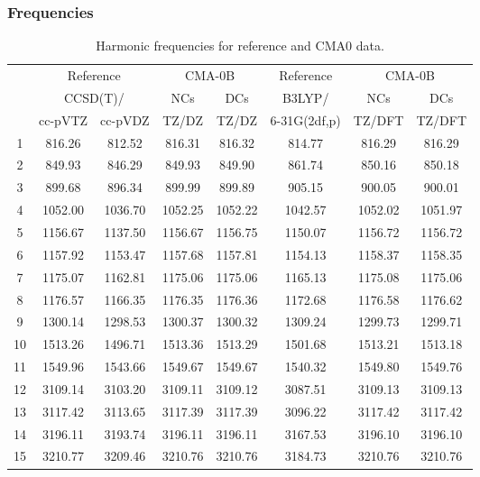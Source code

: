 \documentclass[10pt,oneside]{article}
\begin{document}
\subsubsection*{Frequencies}
\begin{table}[h!]
\centering
\caption{Harmonic frequencies for reference and CMA0 data.}
\begin{tabular}{cccccccc}
\toprule
{} & \multicolumn{2}{c}{Reference} & \multicolumn{2}{c}{CMA-0B} &    Reference & \multicolumn{2}{c}{CMA-0B} \\
{} & \multicolumn{2}{c}{CCSD(T)/} &     NCs &     DCs &       B3LYP/ &     NCs &     DCs \\
{} &   cc-pVTZ & cc-pVDZ &   TZ/DZ &   TZ/DZ & 6-31G(2df,p) &  TZ/DFT &  TZ/DFT \\
\midrule
1  &    816.26 &  812.52 &  816.31 &  816.32 &       814.77 &  816.29 &  816.29 \\
2  &    849.93 &  846.29 &  849.93 &  849.90 &       861.74 &  850.16 &  850.18 \\
3  &    899.68 &  896.34 &  899.99 &  899.89 &       905.15 &  900.05 &  900.01 \\
4  &   1052.00 & 1036.70 & 1052.25 & 1052.22 &      1042.57 & 1052.02 & 1051.97 \\
5  &   1156.67 & 1137.50 & 1156.67 & 1156.75 &      1150.07 & 1156.72 & 1156.72 \\
6  &   1157.92 & 1153.47 & 1157.68 & 1157.81 &      1154.13 & 1158.37 & 1158.35 \\
7  &   1175.07 & 1162.81 & 1175.06 & 1175.06 &      1165.13 & 1175.08 & 1175.06 \\
8  &   1176.57 & 1166.35 & 1176.35 & 1176.36 &      1172.68 & 1176.58 & 1176.62 \\
9  &   1300.14 & 1298.53 & 1300.37 & 1300.32 &      1309.24 & 1299.73 & 1299.71 \\
10 &   1513.26 & 1496.71 & 1513.36 & 1513.29 &      1501.68 & 1513.21 & 1513.18 \\
11 &   1549.96 & 1543.66 & 1549.67 & 1549.67 &      1540.32 & 1549.80 & 1549.76 \\
12 &   3109.14 & 3103.20 & 3109.11 & 3109.12 &      3087.51 & 3109.13 & 3109.13 \\
13 &   3117.42 & 3113.65 & 3117.39 & 3117.39 &      3096.22 & 3117.42 & 3117.42 \\
14 &   3196.11 & 3193.74 & 3196.11 & 3196.11 &      3167.53 & 3196.10 & 3196.10 \\
15 &   3210.77 & 3209.46 & 3210.76 & 3210.76 &      3184.73 & 3210.76 & 3210.76 \\
\bottomrule
\end{tabular}
\end{table}
\end{document}

